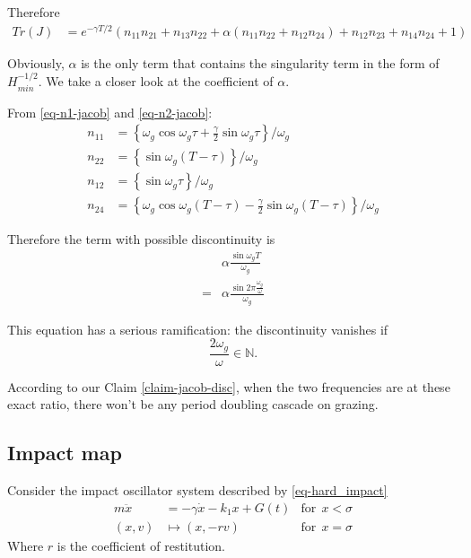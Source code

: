 \documentclass{book}
\renewcommand{\(}{\begin{columns}}
\renewcommand{\)}{\end{columns}}
\newcommand{\<}[1]{\begin{column}{#1}}
\renewcommand{\>}{\end{column}}
\begin{document}
Therefore
\begin{align}
\label{eq-trace-ZDM}
Tr(J)&=e^{-\gamma T/2}(n_{11}n_{21}+n_{13}n_{22}+\alpha(n_{11}n_{22}+n_{12}n_{24})+n_{12}n_{23}+n_{14}n_{24}+1)
\end{align}

Obviously, $\alpha$ is the only term that contains the singularity term in the 
form of $H_{min}^{-1/2}$.  We take a closer look at the coefficient of $\alpha$.  

From \eqref{eq-n1-jacob} and \eqref{eq-n2-jacob}:
\begin{align}
n_{11}&=\left\{\omega_g\cos{\omega_g \tau}+\frac{\gamma}{2}\sin{\omega_g \tau} \right\}/\omega_g\\
n_{22}&=\left\{\sin{\omega_g (T-\tau)} \right\}/\omega_g\\
n_{12}&=\left\{\sin{\omega_g \tau} \right\}/\omega_g\\
n_{24}&=\left\{\omega_g\cos{\omega_g (T-\tau)}-\frac{\gamma}{2}\sin{\omega_g (T-\tau)} \right\}/\omega_g
\end{align}


Therefore the term with possible discontinuity is
\begin{align}
&\alpha\frac{\sin{\omega_g T}}{\omega_g}\\
=&\alpha\frac{\sin{2\pi\frac{\omega_g}{\omega}}}{\omega_g}
\end{align}

This equation has a serious ramification: the discontinuity vanishes if 
\begin{equation}
\label{eq-cond-chaos-vanish}
\frac{2\omega_g}{\omega}\in\mathbb{N}.
\end{equation}

According to our Claim \ref{claim-jacob-disc}, when the two frequencies are at these exact ratio, 
there won't be any period doubling cascade on grazing.  
\subsection{Impact map}
\label{subsec-impact-map}
Consider the impact oscillator system described by \eqref{eq-hard_impact}
\begin{align}
m\ddot{x}&=-\gamma \dot{x}-k_1x+G(t)&\mathrm{for}~~x<\sigma\\
(x,v)&\mapsto (x,-rv)&\mathrm{for}~~x=\sigma
\end{align}
Where $r$ is the coefficient of restitution.  
\end{document}
